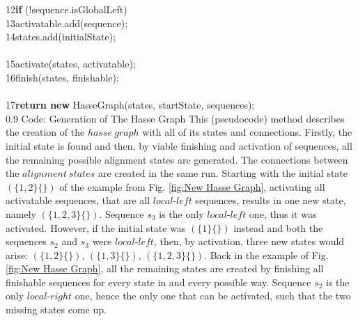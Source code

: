 \documentclass[a4paper,10pt]{thesis}
\newcommand{\lL}{$local\texttt{-}left$}
\newcommand{\lR}{$local\texttt{-}right$}
\begin{document}
{{{{{          12\hspace*{2em}\hspace*{2em}\hspace*{2em}\textbf{if} (!sequence.isGlobalLeft)\\
          13\hspace*{2em}\hspace*{2em}\hspace*{2em}\hspace*{2em}activatable.add(sequence);\\
          14\hspace*{2em}\hspace*{2em}states.add(initialState);\\\\
          15\hspace*{2em}\hspace*{2em}activate(states, activatable);\\
          16\hspace*{2em}\hspace*{2em}finish(states, finishable);\\\\
          17\hspace*{2em}\hspace*{2em}\textbf{return new} HasseGraph(states, startState, sequences);\\
        }
        {0.9\columnwidth}
        {Code: Generation of The Hasse Graph}
        {This (pseudocode) method describes the creation of the $hasse~graph$ with all of its states and connections. Firstly, the initial state is found and then, by viable finishing and activation of sequences, all the remaining possible alignment states are generated. The connections between the $alignment~states$ are created in the same run.}%
        Starting with the initial state $(\{1,2\}\{\})$ of the example from Fig. \ref{fig:New Hasse Graph}, activating all activatable sequences, that are all \lL{} sequences, results in one new state, namely $(\{1,2,3\}\{\})$. Sequence $s_3$ is the only \lL{} one, thus it was activated. However, if the initial state was $(\{1\}\{\})$ instead and both the sequences $s_2$ and $s_3$ were \lL{}, then, by activation, three new states would arise: $(\{1,2\}\{\})$, $(\{1,3\}\{\})$, $(\{1,2,3\}\{\})$. Back in the example of Fig. \ref{fig:New Hasse Graph}, all the remaining states are created by finishing all finishable sequences for every state in and every possible way. Sequence $s_2$ is the only \lR{} one, hence the only one that can be activated, such that the two missing states come up.
}}}}
\end{document}

